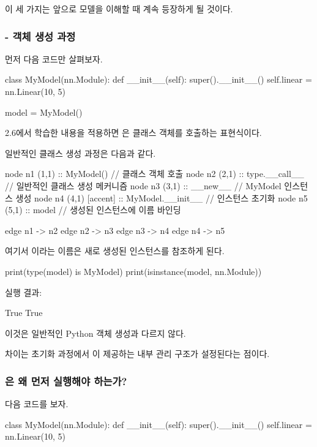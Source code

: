 이 세 가지는 앞으로 모델을 이해할 때 계속 등장하게 될 것이다.

\subsubsection{ - 객체 생성 과정}

먼저 다음 코드만 살펴보자.

\begin{dhkcode}
class MyModel(nn.Module):
    def __init__(self):
        super().__init__()
        self.linear = nn.Linear(10, 5)


model = MyModel()
\end{dhkcode}

2.6에서 학습한 내용을 적용하면 은 클래스 객체를 호출하는 표현식이다.

일반적인 클래스 생성 과정은 다음과 같다.

\begin{dhkgraph}[uniform]
node n1 (1,1) :: MyModel() // 클래스 객체 호출
node n2 (2,1) :: type.__call__ // 일반적인 클래스 생성 메커니즘
node n3 (3,1) :: __new__ // MyModel 인스턴스 생성
node n4 (4,1) [accent] :: MyModel.__init__ // 인스턴스 초기화
node n5 (5,1) :: model // 생성된 인스턴스에 이름 바인딩

edge n1 -> n2
edge n2 -> n3
edge n3 -> n4
edge n4 -> n5
\end{dhkgraph}

여기서 이라는 이름은 새로 생성된  인스턴스를 참조하게 된다.

\begin{dhkcode}
print(type(model) is MyModel)
print(isinstance(model, nn.Module))
\end{dhkcode}

실행 결과:

\begin{dhkzsh}
True
True
\end{dhkzsh}

이것은 일반적인 Python 객체 생성과 다르지 않다.

차이는 초기화 과정에서 이 제공하는 내부 관리 구조가 설정된다는 점이다.

\subsubsection{은 왜 먼저 실행해야 하는가?}

다음 코드를 보자.

\begin{dhkcode}
class MyModel(nn.Module):
    def __init__(self):
        super().__init__()
        self.linear = nn.Linear(10, 5)
\end{dhkcode}

